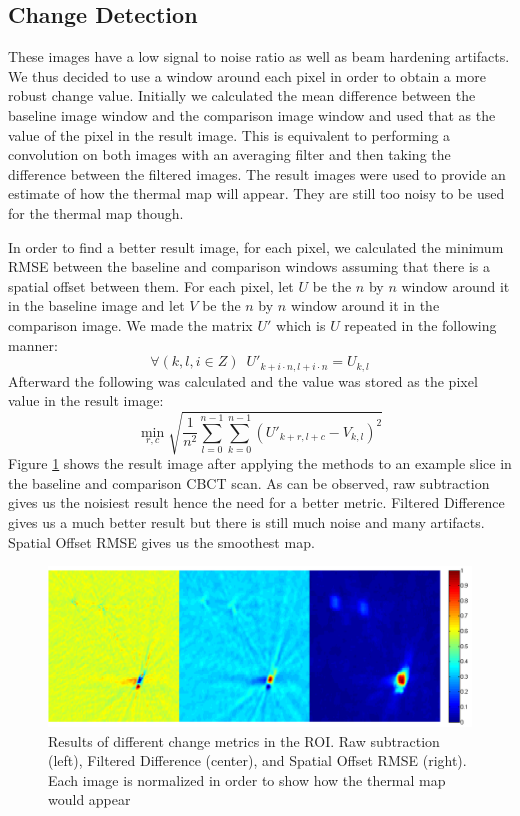 \documentclass[]{spie}  %
\begin{document}
\subsection{Change Detection}

These images have a low signal to noise ratio as well as beam hardening artifacts. We thus decided to use a window around each pixel in order to obtain a more robust change value. Initially we calculated the mean difference between the baseline image window and the comparison image window and used that as the value of the pixel in the result image. This is equivalent to performing a convolution on both images with an averaging filter and then taking the difference between the filtered images. The result images were used to provide an estimate of how the thermal map will appear. They are still too noisy to be used for the thermal map though. 

In order to find a better result image, for each pixel, we calculated the minimum RMSE between the baseline and comparison windows assuming that there is a spatial offset between them. For each pixel, let $U$ be the $n$ by $n$ window around it in the baseline image and let $V$ be the $n$ by $n$ window around it in the comparison image. We made the matrix $U'$ which is $U$ repeated in the following manner:
\[
\forall(k,l,i \in Z)\, \, \, U'_{k+i \cdot n,l+i \cdot n} = U_{k,l}
\]
Afterward the following was calculated and the value was stored as the pixel value in the result image:
\[
\min_{r,c} \sqrt{ \frac{1}{n^2} \sum_{l=0}^{n-1} \sum_{k=0}^{n-1} {(U'_{k+r,l+c}-V_{k,l})^2}}
\]
Figure \ref{changeDetectionMethods} shows the result image after applying the methods to an example slice in the baseline and comparison CBCT scan. As can be observed, raw subtraction gives us the noisiest result hence the need for a better metric. Filtered Difference gives us a much better result but there is still much noise and many artifacts. Spatial Offset RMSE gives us the smoothest map. 

\begin{figure} 
\centering 
\includegraphics[width=\textwidth]{changeDetectionPanel2.png} 
\caption{Results of different change metrics in the ROI. Raw subtraction (left), Filtered Difference (center), and Spatial Offset RMSE (right). Each image is normalized in order to show how the thermal map would appear} 
\label{changeDetectionMethods}
\end{figure}
\end{document}
